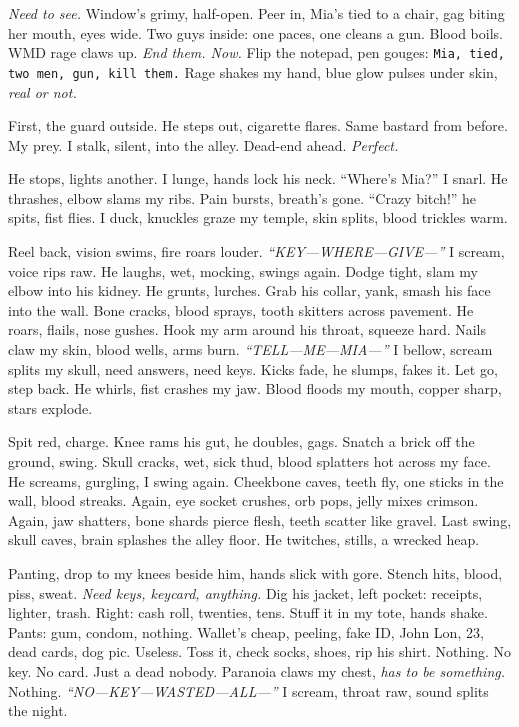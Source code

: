 \documentclass[12pt]{article}
\newcommand{\note}[1]{\texttt{#1}}
\begin{document}
\textit{Need to see.} Window’s grimy, half-open. Peer in, \textnormal{Mia}’s tied to a chair, gag biting her mouth, eyes wide. Two guys inside: one paces, one cleans a gun. Blood boils. WMD rage claws up. \textit{End them. Now.} Flip the notepad, pen gouges: \note{Mia, tied, two men, gun, kill them.} Rage shakes my hand, blue glow pulses under skin, \textit{real or not.}

First, the guard outside. He steps out, cigarette flares. Same bastard from before. My prey. I stalk, silent, into the alley. Dead-end ahead. \textit{Perfect.}

He stops, lights another. I lunge, hands lock his neck. “Where’s \textnormal{Mia}?” I snarl. He thrashes, elbow slams my ribs. Pain bursts, breath’s gone. “Crazy bitch!” he spits, fist flies. I duck, knuckles graze my temple, skin splits, blood trickles warm.

Reel back, vision swims, fire roars louder. \textit{“KEY—WHERE—GIVE—”} I scream, voice rips raw. He laughs, wet, mocking, swings again. Dodge tight, slam my elbow into his kidney. He grunts, lurches. Grab his collar, yank, smash his face into the wall. Bone cracks, blood sprays, tooth skitters across pavement. He roars, flails, nose gushes. Hook my arm around his throat, squeeze hard. Nails claw my skin, blood wells, arms burn. \textit{“TELL—ME—MIA—”} I bellow, scream splits my skull, need answers, need keys. Kicks fade, he slumps, fakes it. Let go, step back. He whirls, fist crashes my jaw. Blood floods my mouth, copper sharp, stars explode.

Spit red, charge. Knee rams his gut, he doubles, gags. Snatch a brick off the ground, swing. Skull cracks, wet, sick thud, blood splatters hot across my face. He screams, gurgling, I swing again. Cheekbone caves, teeth fly, one sticks in the wall, blood streaks. Again, eye socket crushes, orb pops, jelly mixes crimson. Again, jaw shatters, bone shards pierce flesh, teeth scatter like gravel. Last swing, skull caves, brain splashes the alley floor. He twitches, stills, a wrecked heap.

Panting, drop to my knees beside him, hands slick with gore. Stench hits, blood, piss, sweat. \textit{Need keys, keycard, anything.} Dig his jacket, left pocket: receipts, lighter, trash. Right: cash roll, twenties, tens. Stuff it in my tote, hands shake. Pants: gum, condom, nothing. Wallet’s cheap, peeling, fake ID, \textnormal{John Lon}, 23, dead cards, dog pic. Useless. Toss it, check socks, shoes, rip his shirt. Nothing. No key. No card. Just a dead nobody. Paranoia claws my chest, \textit{has to be something.} Nothing. \textit{“NO—KEY—WASTED—ALL—”} I scream, throat raw, sound splits the night.
\end{document}
